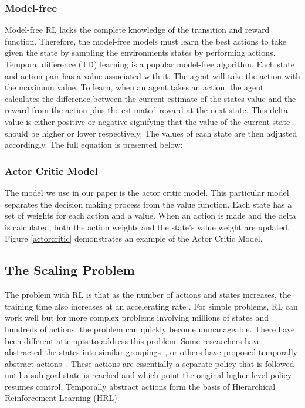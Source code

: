 \subsubsection{Model-free}
Model-free RL lacks the complete knowledge of the transition and reward function. Therefore, the model-free models must learn the best actions to take given the state by sampling the environments states by performing actions. 
Temporal difference (TD) learning is a popular model-free algorithm. Each state and action pair has a value associated with it. The agent will take the action with the maximum value. To learn, when an agent takes an action, the agent calculates the difference between the current estimate of the states value and the reward from the action plus the estimated reward at the next state. This delta value is either positive or negative signifying that the value of the current state should be higher or lower respectively. The values of each state are then adjusted accordingly. The full equation is presented below: 

\subsubsection{Actor Critic Model}
The model we use in our paper is the actor critic model. This particular model separates the decision making process from the value function. Each state has a set of weights for each action and a value. When an action is made and the delta is calculated, both the action weights and the state's value weight are updated. Figure \ref{actorcritic} demonstrates an example of the Actor Critic Model.

\subsection{The Scaling Problem}
The problem with RL is that as the number of actions and states increases, the training time also increases at an accelerating rate \cite{botvinick2009hierarchically}. For simple problems, RL can work well but for more complex problems involving millions of states and hundreds of actions, the problem can quickly become unmanageable. There have been different attempts to address this problem. Some researchers have abstracted the states into similar groupings~\cite{li2006towards}, or others have proposed temporally abstract actions~\cite{sutton1999between}. These actions are essentially a separate policy that is followed until a sub-goal state is reached and which point the original higher-level policy resumes control. Temporally abstract actions form the basis of Hierarchical Reinforcement Learning (HRL).

